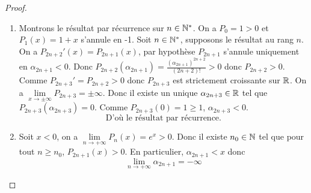 \documentclass[12pt]{article}
\begin{document}
\begin{proof}
	\phantom{}
	\begin{enumerate}
		\item Montrons le résultat par récurrence sur $n\in\mathbb{N}^{*}$. On a $P_{0}=1>0$ et $P_{1}(x)=1+x$ s'annule en -1. Soit $n\in\mathbb{N}^{*}$, supposons le résultat au rang $n$. On a $P_{2n+2}'(x)=P_{2n+1}(x)$, par hypothèse $P_{2n+1}$ s'annule uniquement en $\alpha_{2n+1}<0$. Donc $P_{2n+2}	(\alpha_{2n+1})=\frac{\left(\alpha_{2n+1}\right)^{2n+2}}{(2n+2)!}>0$ donc $P_{2n+2}>0$.
		Comme $P_{2n+3}'=P_{2n+2}>0$ donc $P_{2n+3}$ est strictement croissante sur $\mathbb{R}$. On a $\lim\limits_{x\to\pm\infty}P_{2n+3}=\pm\infty$. Donc il existe un unique $\alpha_{2n+3}\in\mathbb{R}$ tel que $P_{2n+3}(\alpha_{2n+3})=0$. Comme $P_{2n+3}(0)=1\geqslant1$, $\alpha_{2n+3}<0$.
		\begin{equation}\boxed{\text{D'où le résultat par récurrence.}}\end{equation}

		\item Soit $x<0$, on a $\lim\limits_{n\to+\infty}P_{n}(x)=e^{x}>0$. Donc il existe $n_{0}\in\mathbb{N}$ tel que pour tout $n\geqslant n_{0}$, $P_{2n+1}(x)>0$. En particulier, $\alpha_{2n+1}<x$ donc 
		\begin{equation}\boxed{\lim\limits_{n\to+\infty}\alpha_{2n+1}=-\infty}\end{equation}
	\end{enumerate}
\end{proof}
\end{document}

